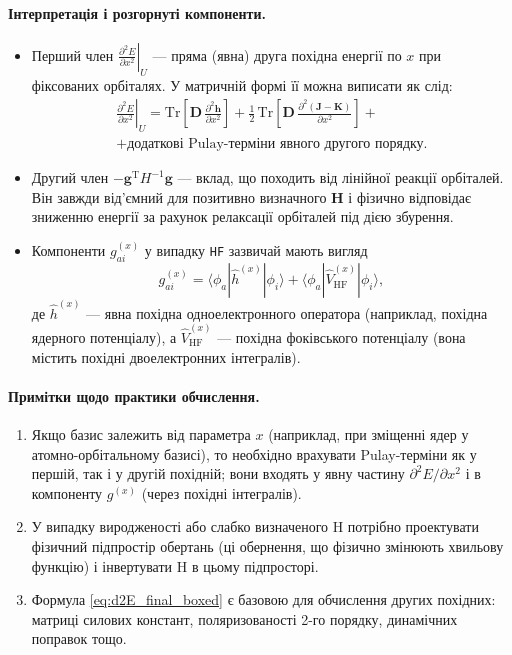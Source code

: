 \paragraph{Інтерпретація і розгорнуті компоненти.}
\begin{itemize}
	\item Перший член $\displaystyle\left.\frac{\partial^2 E}{\partial x^2}\right|_{U}$ — пряма (явна) друга похідна енергії по $x$ при фіксованих орбіталях. У матричній формі її можна виписати як слід:
	      \begin{multline*}
		      \left.\frac{\partial^2 E}{\partial x^2}\right|_{U}
		      =
		      \mathrm{Tr}\!\left[\mathbf D\,\frac{\partial^2\mathbf h}{\partial x^2}\right]
		      +\tfrac12\,\mathrm{Tr}\!\left[\mathbf D\,\frac{\partial^2(\mathbf J-\mathbf K)}{\partial x^2}\right]
		      + \\ +\text{додаткові Pulay-терміни явного другого порядку}.
	      \end{multline*}
	\item Другий член $-\mathbf g^{\mathrm T} H^{-1}\mathbf g$ — вклад, що походить від лінійної реакції орбіталей. Він завжди від'ємний для позитивно визначного $\mathbf H$ і фізично відповідає зниженню енергії за рахунок релаксації орбіталей під дією збурення.
	\item Компоненти $g^{(x)}_{ai}$ у випадку \texttt{HF} зазвичай мають вигляд
	      \[
		      g^{(x)}_{ai} = \langle \phi_a | \hat h^{(x)} | \phi_i \rangle
		      + \langle \phi_a | \hat V^{(x)}_\text{HF} | \phi_i \rangle,
	      \]
	      де $\hat h^{(x)}$ — явна похідна одноелектронного оператора (наприклад, похідна ядерного потенціалу), а $\hat V^{(x)}_\text{HF}$ — похідна фоківського потенціалу (вона містить похідні двоелектронних інтегралів).
\end{itemize}

\paragraph{Примітки щодо практики обчислення.}
\begin{enumerate}
	\item Якщо базис залежить від параметра $x$ (наприклад, при зміщенні ядер у атомно-орбітальному базисі), то необхідно врахувати Pulay-терміни як у першій, так і у другій похідній; вони входять у явну частину $\partial^2E/\partial x^2$ і в компоненту $g^{(x)}$ (через похідні інтегралів).
	\item У випадку виродженості або слабко визначеного H потрібно проектувати фізичний підпростір обертань (ці обернення, що фізично змінюють хвильову функцію) і інвертувати H в цьому підпросторі.
	\item Формула \eqref{eq:d2E_final_boxed} є базовою для обчислення других похідних: матриці силових констант, поляризованості 2-го порядку, динамічних поправок тощо.
\end{enumerate}


